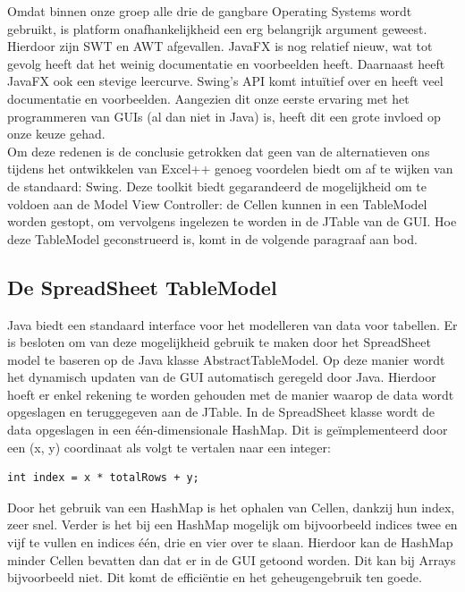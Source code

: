 \documentclass[a4paper,11pt,titlepage]{scrartcl}
\begin{document}
Omdat binnen onze groep alle drie de gangbare Operating Systems wordt gebruikt, is platform onafhankelijkheid een erg belangrijk argument geweest. Hierdoor zijn SWT en AWT afgevallen. JavaFX is nog relatief nieuw, wat tot gevolg heeft dat het weinig documentatie en voorbeelden heeft. Daarnaast heeft JavaFX ook een stevige leercurve. Swing's API komt intuïtief over en heeft veel documentatie en voorbeelden. Aangezien dit onze eerste ervaring met het programmeren van GUIs (al dan niet in Java) is, heeft dit een grote invloed op onze keuze gehad.\\

Om deze redenen is de conclusie getrokken dat geen van de alternatieven ons tijdens het ontwikkelen van Excel++ genoeg voordelen biedt om af te wijken van de standaard: Swing. Deze toolkit biedt gegarandeerd de mogelijkheid om te voldoen aan de Model View Controller: de Cellen kunnen in een TableModel worden gestopt, om vervolgens ingelezen te worden in de JTable van de GUI. Hoe deze TableModel geconstrueerd is, komt in de volgende paragraaf aan bod.\\

\newpage\subsection{De SpreadSheet TableModel}
Java biedt een standaard interface voor het modelleren van data voor tabellen. Er is besloten om van deze mogelijkheid gebruik te maken door het SpreadSheet model te baseren op de Java klasse AbstractTableModel. Op deze manier wordt het dynamisch updaten van de GUI automatisch geregeld door Java. Hierdoor hoeft er enkel rekening te worden gehouden met de manier waarop de data wordt opgeslagen en teruggegeven aan de JTable. In de SpreadSheet klasse wordt de data opgeslagen in een één-dimensionale HashMap. Dit is geïmplementeerd door een (x, y) coordinaat als volgt te vertalen naar een integer:
\begin{verbatim}
int index = x * totalRows + y;
\end{verbatim}

Door het gebruik van een HashMap is het ophalen van Cellen, dankzij hun index, zeer snel. Verder is het bij een HashMap mogelijk om bijvoorbeeld indices twee en vijf te vullen en indices één, drie en vier over te slaan. Hierdoor kan de HashMap minder Cellen bevatten dan dat er in de GUI getoond worden. Dit kan bij Arrays bijvoorbeeld niet. Dit komt de efficiëntie en het geheugengebruik ten goede.
\end{document}
